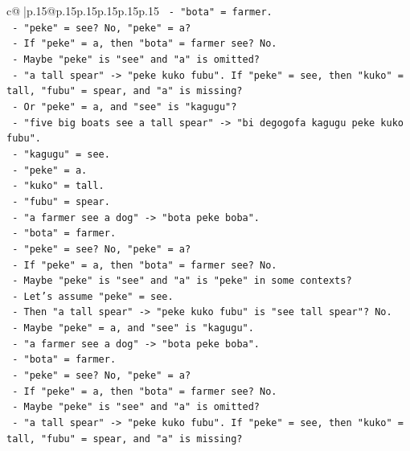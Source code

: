 \documentclass{article}
\begin{document}
{\begin{supertabular}{c@{$\;$}|p{.15\linewidth}@{}p{.15\linewidth}p{.15\linewidth}p{.15\linewidth}p{.15\linewidth}p{.15\linewidth}}
{{{\texttt{        {-} "bota" = farmer.} \\
\texttt{        {-} "peke" = see? No, "peke" = a?} \\
\texttt{        {-} If "peke" = a, then "bota" = farmer see? No.} \\
\texttt{        {-} Maybe "peke" is "see" and "a" is omitted?} \\
\texttt{        {-} "a tall spear" {-}> "peke kuko fubu". If "peke" = see, then "kuko" = tall, "fubu" = spear, and "a" is missing?} \\
\texttt{        {-} Or "peke" = a, and "see" is "kagugu"?} \\
\texttt{        {-} "five big boats see a tall spear" {-}> "bi degogofa kagugu peke kuko fubu".} \\
\texttt{        {-} "kagugu" = see.} \\
\texttt{        {-} "peke" = a.} \\
\texttt{        {-} "kuko" = tall.} \\
\texttt{        {-} "fubu" = spear.} \\
\texttt{        {-} "a farmer see a dog" {-}> "bota peke boba".} \\
\texttt{        {-} "bota" = farmer.} \\
\texttt{        {-} "peke" = see? No, "peke" = a?} \\
\texttt{        {-} If "peke" = a, then "bota" = farmer see? No.} \\
\texttt{        {-} Maybe "peke" is "see" and "a" is "peke" in some contexts?} \\
\texttt{        {-} Let's assume "peke" = see.} \\
\texttt{        {-} Then "a tall spear" {-}> "peke kuko fubu" is "see tall spear"? No.} \\
\texttt{        {-} Maybe "peke" = a, and "see" is "kagugu".} \\
\texttt{        {-} "a farmer see a dog" {-}> "bota peke boba".} \\
\texttt{        {-} "bota" = farmer.} \\
\texttt{        {-} "peke" = see? No, "peke" = a?} \\
\texttt{        {-} If "peke" = a, then "bota" = farmer see? No.} \\
\texttt{        {-} Maybe "peke" is "see" and "a" is omitted?} \\
\texttt{        {-} "a tall spear" {-}> "peke kuko fubu". If "peke" = see, then "kuko" = tall, "fubu" = spear, and "a" is missing?} \\
}}}
\end{supertabular}}
\end{document}
